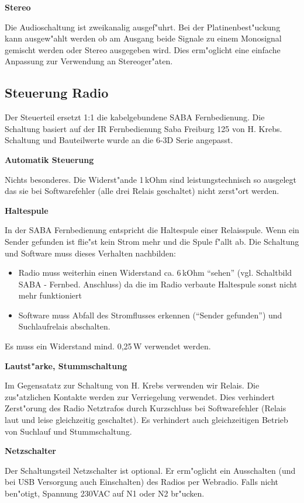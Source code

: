 \documentclass[ngerman,11pt,parskip=half] {scrartcl}
\begin{document}
\textbf{Stereo}

Die Audioschaltung ist zweikanalig ausgef"uhrt. Bei der Platinenbest"uckung kann ausgew"ahlt werden ob am Ausgang beide Signale zu einem Monosignal gemischt werden oder Stereo ausgegeben wird. Dies erm"oglicht eine einfache Anpassung zur Verwendung an Stereoger"aten.

\subsection{Steuerung Radio} \label{sec:schaltung:steuern-radio}

Der Steuerteil ersetzt 1:1 die kabelgebundene SABA Fernbedienung. Die Schaltung basiert auf der IR Fernbedienung Saba Freiburg 125 von H. Krebs. Schaltung und Bauteilwerte wurde an die 6-3D Serie angepasst.

\textbf{Automatik Steuerung}

Nichts besonderes. Die Widerst"ande 1\,kOhm sind leistungstechnisch so ausgelegt das sie bei Softwarefehler (alle drei Relais geschaltet) nicht zerst"ort werden.

\textbf{Haltespule}

In der SABA Fernbedienung entspricht die Haltespule einer Relaisspule. Wenn ein Sender gefunden ist flie"st kein Strom mehr und die Spule f"allt ab. Die Schaltung und Software muss dieses Verhalten nachbilden:
\begin{itemize}
\item Radio muss weiterhin einen Widerstand ca. 6\,kOhm "`sehen"' (vgl. Schaltbild SABA - Fernbed. Anschluss) da die im Radio verbaute Haltespule sonst nicht mehr funktioniert
\item Software muss Abfall des Stromflusses erkennen ("`Sender gefunden"') und Suchlaufrelais abschalten.
\end{itemize}
Es muss ein Widerstand mind. 0,25\,W verwendet werden.

\textbf{Lautst"arke, Stummschaltung}

Im Gegensatatz zur Schaltung von H. Krebs verwenden wir Relais. Die zus"atzlichen Kontakte werden zur Verriegelung verwendet. Dies verhindert Zerst"orung des Radio Netztrafos durch Kurzschluss bei Softwarefehler (Relais laut und leise gleichzeitig geschaltet). Es verhindert auch gleichzeitigen Betrieb von Suchlauf und Stummschaltung.

\textbf{Netzschalter}

Der Schaltungsteil Netzschalter ist optional. Er erm"oglicht ein Ausschalten (und bei USB Versorgung auch Einschalten) des Radios per Webradio. Falls nicht ben"otigt, Spannung 230VAC auf N1 oder N2 br"ucken.
\end{document}
